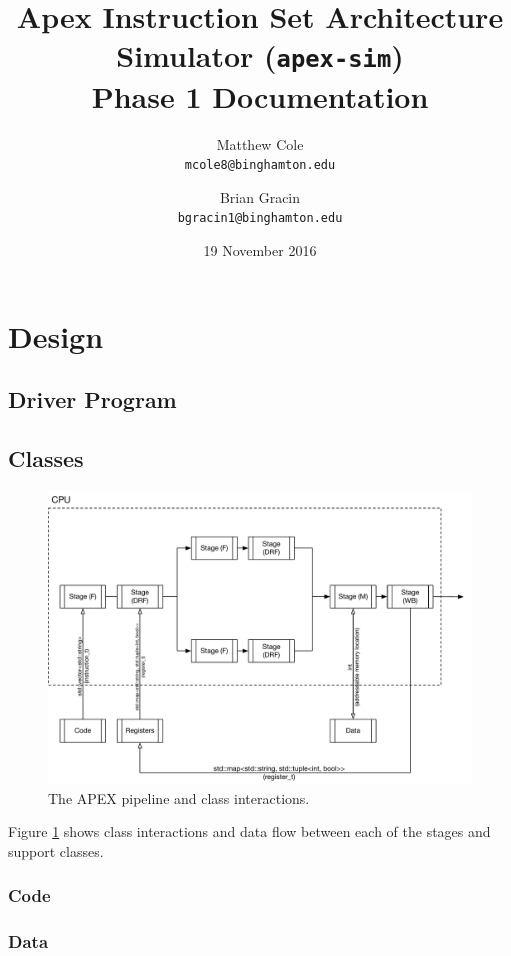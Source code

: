 \documentclass[12pt]{article}
\title{Apex Instruction Set Architecture Simulator (\texttt{apex-sim}) \\ Phase 1 Documentation}
\author{Matthew Cole \\ \texttt{mcole8@binghamton.edu}
\and
Brian Gracin \\ 
	\texttt{bgracin1@binghamton.edu}}
\date{19 November 2016} %
\begin{document}
\maketitle
\tableofcontents
\listoffigures
\newpage
{}

\section{Design}
\blindtext

\subsection{Driver Program}

\subsection{Classes}

\begin{figure}
  \includegraphics[width=\linewidth]{./figs/apex-sim-overview.pdf}
  \caption{The APEX pipeline and class interactions.}
  \label{fig:overview}
\end{figure}

Figure \ref{fig:overview} shows class interactions and data flow between each of the stages and support classes.

\subsubsection{Code}

\subsubsection{Data}
\end{document}
